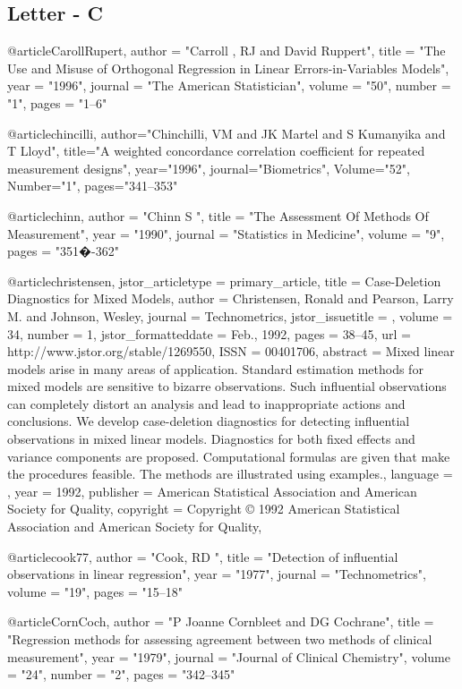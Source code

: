 \subsection*{Letter - C}


@article{CarollRupert,
	author = "Carroll , RJ and David Ruppert",
	title = "The Use and Misuse of Orthogonal Regression in Linear Errors-in-Variables Models",
	year = "1996",
	journal = "The American Statistician",
	volume = "50",
	number = "1",
	pages = "1--6"
}


@article{chincilli,
	author="Chinchilli, VM and JK Martel and S Kumanyika and T Lloyd",
	title="A weighted concordance correlation coefficient for repeated measurement designs",
	year="1996",
	journal="Biometrics",
	Volume="52",
	Number="1",
	pages="341--353"
}


@article{chinn,
	author = "Chinn S ",
	title = "The Assessment Of Methods Of Measurement",
	year = "1990",
	journal = "Statistics in Medicine",
	volume = "9",
	pages = "351�-362"
}



@article{christensen,
	jstor_articletype = {primary_article},
	title = {Case-Deletion Diagnostics for Mixed Models},
	author = {Christensen, Ronald and Pearson, Larry M. and Johnson, Wesley},
	journal = {Technometrics},
	jstor_issuetitle = {},
	volume = {34},
	number = {1},
	jstor_formatteddate = {Feb., 1992},
	pages = {38--45},
	url = {http://www.jstor.org/stable/1269550},
	ISSN = {00401706},
	abstract = {Mixed linear models arise in many areas of application. Standard estimation methods for mixed models are sensitive to bizarre observations. Such influential observations can completely distort an analysis and lead to inappropriate actions and conclusions. We develop case-deletion diagnostics for detecting influential observations in mixed linear models. Diagnostics for both fixed effects and variance components are proposed. Computational formulas are given that make the procedures feasible. The methods are illustrated using examples.},
	language = {},
	year = {1992},
	publisher = {American Statistical Association and American Society for Quality},
	copyright = {Copyright © 1992 American Statistical Association and American Society for Quality},
}

@article{cook77,
	author = "Cook, RD ",
	title = "Detection of influential observations in linear regression",
	year = "1977",
	journal = "Technometrics",
	volume = "19",
	pages = "15--18"
}


@article{CornCoch,
	author = "P Joanne Cornbleet and DG Cochrane",
	title = "Regression methods for assessing agreement between two methods of clinical measurement",
	year = "1979",
	journal = "Journal of Clinical Chemistry",
	volume = "24",
	number = "2",
	pages = "342--345"
}


